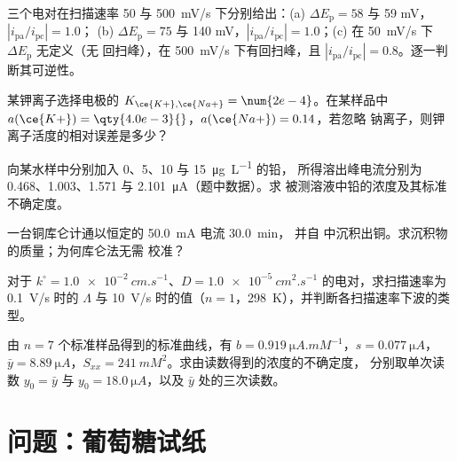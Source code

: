 \begin{exercise}[$\star\star$]\label{exo:b3:electrode-kinetics:7}
三个电对在扫描速率 50 与 \qty{500}{mV/s} 下分别给出：(a) $\Delta E_{\mathrm p} = 58$ 与 59 mV，$|i_{\mathrm{pa}}/i_{\mathrm{pc}}| = 1.0$；
(b) $\Delta E_{\mathrm p} = 75$ 与 140 mV，$|i_{\mathrm{pa}}/i_{\mathrm{pc}}| = 1.0$；(c) 在 \qty{50}{mV/s} 下 $\Delta E_{\mathrm p}$ 无定义（无
回扫峰），在 \qty{500}{mV/s} 下有回扫峰，且 $|i_{\mathrm{pa}}/i_{\mathrm{pc}}| = 0.8$。逐一判断其可逆性。
\end{exercise}

\begin{exercise}[$\star\star$]\label{exo:b3:electrode-kinetics:8}
某钾离子选择电极的 $K_{\ce{K+},\ce{Na+}} = \num{2e-4}$。在某样品中 $a(\ce{K+}) =
\qty{4.0e-3}{}$，$a(\ce{Na+}) = 0.14$，若忽略
钠离子，则钾离子活度的相对误差是多少？
\end{exercise}

\begin{exercise}[$\star\star$]\label{exo:b3:electrode-kinetics:9}
向某水样中分别加入 0、5、10 与 \qty{15}{\micro g.L^{-1}} 的铅，
所得溶出峰电流分别为 0.468、1.003、1.571 与 \qty{2.101}{\micro A}（题中数据）。求
被测溶液中铅的浓度及其标准不确定度。
\end{exercise}

\begin{exercise}[$\star\star\star$]\label{exo:b3:electrode-kinetics:10}
一台铜库仑计通以恒定的 \qty{50.0}{mA} 电流 \qty{30.0}{min}，
并自  中沉积出铜。求沉积物的质量；为何库仑法无需
校准？
\end{exercise}

\begin{exercise}[$\star\star\star$]\label{exo:b3:electrode-kinetics:11}
对于 $k^\circ = \qty{1.0e-2}{cm.s^{-1}}$、$D = \qty{1.0e-5}{cm^2.s^{-1}}$ 的电对，求扫描速率为 \qty{0.1}{V/s}
时的 $\Lambda$ 与 \qty{10}{V/s} 时的值（$n = 1$，\qty{298}{K}），并判断各扫描速率下波的类型。
\end{exercise}

\begin{exercise}[$\star\star\star$]\label{exo:b3:electrode-kinetics:12}
由 $n = 7$ 个标准样品得到的标准曲线，有 $b = \qty{0.919}{\micro A.mM^{-1}}$，$s = \qty{0.077}{\micro A}$，
$\bar y = \qty{8.89}{\micro A}$，$S_{xx} = \qty{241}{mM^2}$。求由读数得到的浓度的不确定度，
分别取单次读数 $y_0 = \bar y$ 与 $y_0 = \qty{18.0}{\micro A}$，以及 $\bar y$ 处的三次读数。
\end{exercise}

\section{问题：葡萄糖试纸}

